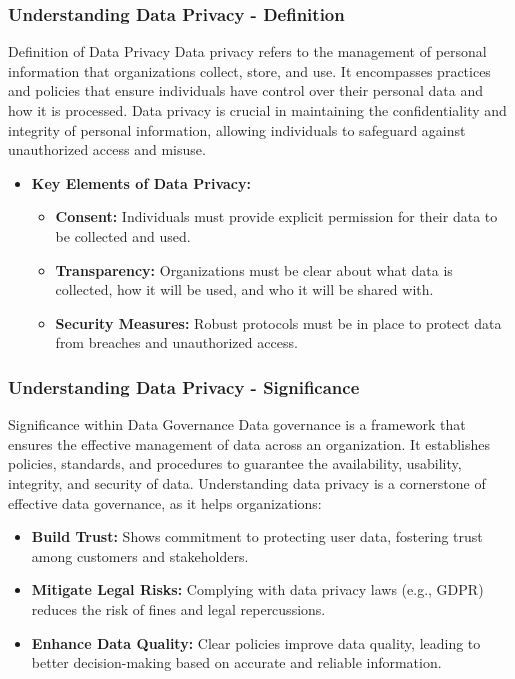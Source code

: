 \documentclass[aspectratio=169]{beamer}
\begin{document}
\begin{frame}[fragile]
    \frametitle{Understanding Data Privacy - Definition}
    \begin{block}{Definition of Data Privacy}
        Data privacy refers to the management of personal information that organizations collect, store, and use. 
        It encompasses practices and policies that ensure individuals have control over their personal data and how it is processed. 
        Data privacy is crucial in maintaining the confidentiality and integrity of personal information, allowing individuals to safeguard against unauthorized access and misuse.
    \end{block}

    \begin{itemize}
        \item \textbf{Key Elements of Data Privacy:}
        \begin{itemize}
            \item \textbf{Consent:} Individuals must provide explicit permission for their data to be collected and used.
            \item \textbf{Transparency:} Organizations must be clear about what data is collected, how it will be used, and who it will be shared with.
            \item \textbf{Security Measures:} Robust protocols must be in place to protect data from breaches and unauthorized access.
        \end{itemize}
    \end{itemize}
\end{frame}

\begin{frame}[fragile]
    \frametitle{Understanding Data Privacy - Significance}
    \begin{block}{Significance within Data Governance}
        Data governance is a framework that ensures the effective management of data across an organization. 
        It establishes policies, standards, and procedures to guarantee the availability, usability, integrity, and security of data. 
        Understanding data privacy is a cornerstone of effective data governance, as it helps organizations:
    \end{block}

    \begin{itemize}
        \item \textbf{Build Trust:} Shows commitment to protecting user data, fostering trust among customers and stakeholders.
        \item \textbf{Mitigate Legal Risks:} Complying with data privacy laws (e.g., GDPR) reduces the risk of fines and legal repercussions.
        \item \textbf{Enhance Data Quality:} Clear policies improve data quality, leading to better decision-making based on accurate and reliable information.
    \end{itemize}
\end{frame}
\end{document}
